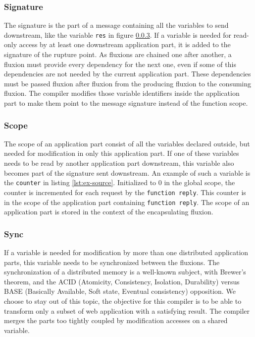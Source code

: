 \subsubsection{Signature}

The signature is the part of a message containing all the variables to send downstream, like the variable \texttt{res} in figure \ref{}\TODO.
If a variable is needed for read-only access by at least one downstream application part, it is added to the signature of the rupture point.
As fluxions are chained one after another, a fluxion must provide every dependency for the next one, even if some of this dependencies are not needed by the current application part.
These dependencies must be passed fluxion after fluxion from the producing fluxion to the consuming fluxion.
The compiler modifies those variable identifiers inside the application part to make them point to the message signature instead of the function scope.

\subsubsection{Scope}

The scope of an application part consist of all the variables declared outside, but needed for modification in only this application part.
If one of these variables needs to be read by another application part downstream, this variable also becomes part of the signature sent downstream.
An example of such a variable is the \texttt{counter} in listing \ref{lst:ex-source}. Initialized to 0 in the global scope, the counter is incremented for each request by the \texttt{function reply}.
This counter is in the scope of the application part containing \texttt{function reply}.
The scope of an application part is stored in the context of the encapsulating fluxion.

\subsubsection{Sync}

If a variable is needed for modification by more than one distributed application parts, this variable needs to be synchronized between the fluxions.
The synchronization of a distributed memory is a well-known subject, with Brewer's theorem\cite{Gilbert2002}\cite{codahale2010}, and the ACID (Atomicity, Consistency, Isolation, Durability) versus BASE (Basically Available, Soft state, Eventual consistency) opposition\cite{Fox1997}.
We choose to stay out of this topic, the objective for this compiler is to be able to transform only a subset of web application with a satisfying result.
The compiler merges the parts too tightly coupled by modification accesses on a shared variable.

